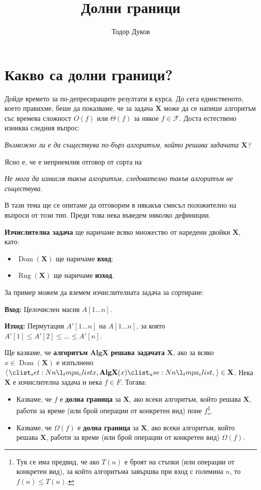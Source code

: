 \documentclass{article}
\title{Долни граници}
\author{Тодор Дуков}
\date{}
\theoremstyle{definition}
\theoremstyle{plain}
\theoremstyle{remark}
\theoremstyle{definition}
\begin{document}
\maketitle

\section*{Какво са долни граници?}

Дойде времето за по-депресиращите резултати в курса.
До сега единственото, което правихме, беше да показваме, че за задача $\mathbf{X}$ може да се напише алгоритъм със времева сложност $O(f)$ или $\Theta(f)$ за някое $f \in \mathcal{F}$.
Доста естествено изниква следния въпрос:
\begin{center}
    \textit{Възможно ли е да съществува по-бърз алгоритъм, който решава задачата $\mathbf{X}$?}
\end{center}
Ясно е, че е неприемлив отговор от сорта на
\begin{center}
    \textit{Не мога да измисля такъв алгоритъм, следователно такъв алгоритъм не съществува.}
\end{center}
В тази тема ще се опитаме да отговорим в някакъв смисъл положително на въпроси от този тип.
Преди това нека въведем няколко дефиниции.

\textbf{Изчислителна задача} ще наричаме всяко множество от наредени двойки $\mathbf{X}$, като:
\begin{itemize}
    \item $\operatorname{Dom}(\mathbf{X})$ ще наричаме \textbf{вход};
    \item $\operatorname{Rng}(\mathbf{X})$ ще наричаме \textbf{изход}.
\end{itemize}
За пример можем да вземем изчислителната задача за сортиране:

\vspace*{2mm}
\textbf{Вход:} Целочислен масив $A[1 \dots n]$.

\textbf{Изход:} Пермутация $A'[1 \dots n]$ на $A[1 \dots n]$, за която $A'[1] \leq A'[2] \leq \dots \leq A'[n]$.
\vspace*{2mm}

Ще казваме, че \textbf{алгоритъм} $\mathbf{AlgX}$ \textbf{решава задачата} $\mathbf{X}$, ако за всяко $x \in \operatorname{Dom}(\mathbf{X})$ е изпълнено $\opair{x, \mathbf{AlgX}(x)} \in \mathbf{X}$.
Нека $\mathbf{X}$ е изчислителна задача и нека $f \in F$.
Тогава:
\begin{itemize}
    \item Казваме, че $f$ е \textbf{долна граница} за $\mathbf{X}$, ако всеки алгоритъм, който решава $\mathbf{X}$, работи за време (или брой операции от конкретен вид) поне $f$\footnote{
              Тук се има предвид, че ако $T(n)$ е броят на стъпки (или операции от конкретен вид), за който алгоритъма завършва при вход с големина $n$, то $f(n) \leq T(n)$.
          }.
    \item Казваме, че $\Omega(f)$ е \textbf{долна граница} за $\mathbf{X}$, ако всеки алгоритъм, който решава $\mathbf{X}$, работи за време (или брой операции от конкретен вид) $\Omega(f)$.
\end{itemize}
\end{document}
